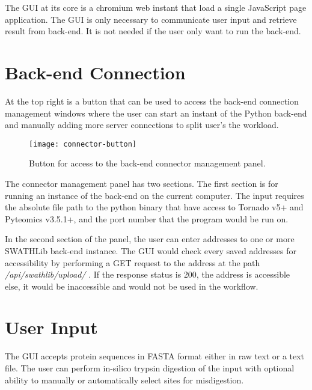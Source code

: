\documentclass[../manual.tex]{subfiles}
\begin{document}
The GUI at its core is a chromium web instant that load a single JavaScript page application. The GUI is only necessary to communicate user input and retrieve result from back-end. It is not needed if the user only want to run the back-end.\par

\section{Back-end Connection}
At the top right is a button that can be used to access the back-end connection management windows where the user can start an instant of the Python back-end and manually adding more server connections to split user's the workload.\par

\begin{figure}[h]
	\centering
	\begin{framed}
		\centering
		\texttt{[image: connector-button]}
		\caption{Button for access to the back-end connector management panel.}\label{fig:connectorbutton}
	\end{framed}
\end{figure}

The connector management panel has two sections. The first section is for running an instance of the back-end on the current computer. The input requires the absolute file path to the python binary that have access to Tornado v5+ and Pyteomics v3.5.1+, and the port number that the program would be run on.\par

In the second section of the panel, the user can enter addresses to one or more SWATHLib back-end instance. The GUI would check every saved addresses for accessibility by performing a GET request to the address at the path \emph{/api/swathlib/upload/} . If the response status is 200, the address is accessible else, it would be inaccessible and would not be used in the workflow.\par 

\section{User Input}
The GUI accepts protein sequences in FASTA format either in raw text or a text file. The user can perform in-silico trypsin digestion of the input with optional ability to manually or automatically select sites for misdigestion.\par
\end{document}
